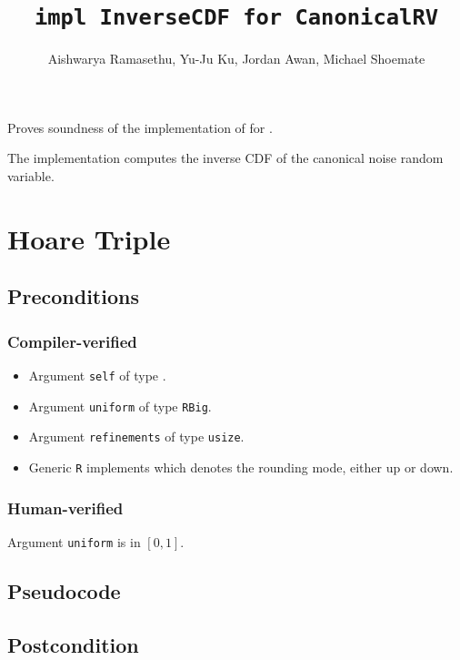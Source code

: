 \documentclass{article}
\title{\texttt{impl InverseCDF for CanonicalRV}}
\author{Aishwarya Ramasethu, Yu-Ju Ku, Jordan Awan, Michael Shoemate}
\begin{document}
\maketitle

Proves soundness of the implementation of  
for .

The implementation computes the inverse CDF of the canonical noise random variable.

\section{Hoare Triple}

\subsection*{Preconditions}
\subsubsection*{Compiler-verified}
\begin{itemize}
    \item Argument \texttt{self} of type .
    \item Argument \texttt{uniform} of type \texttt{RBig}.
    \item Argument \texttt{refinements} of type \texttt{usize}.
    \item Generic \texttt{R} implements  which denotes the rounding mode, either up or down.
\end{itemize}

\subsubsection*{Human-verified}
Argument \texttt{uniform} is in $[0, 1]$.

\subsection*{Pseudocode}



\subsection*{Postcondition}
\end{document}
